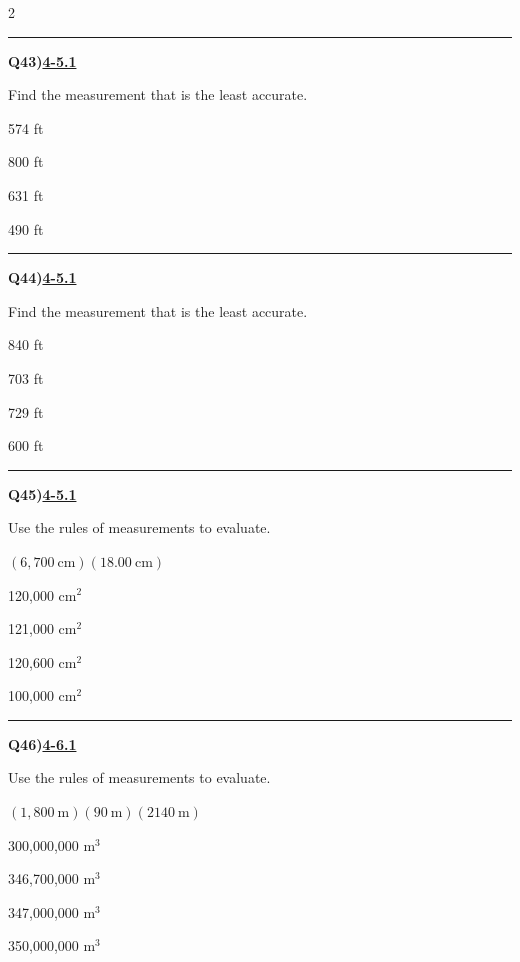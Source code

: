 \documentclass[11pt]{article}
\newenvironment{Qbox}[2]{%
  \par\medskip\noindent\begin{minipage}{\linewidth}%
  \hrule\medskip%
  \textbf{Q#1)}\hfill\textbf{\underline{#2}}\par\smallskip%
}{\par\end{minipage}\par\medskip}
\begin{document}
\begin{multicols}{2}
\begin{Qbox}{43}{4-5.1}
Find the measurement that is the least accurate.
\begin{choices}
  \item 574 ft
  \item 800 ft
  \item 631 ft
  \item 490 ft
\end{choices}
\end{Qbox}

\begin{Qbox}{44}{4-5.1}
Find the measurement that is the least accurate.
\begin{choices}
  \item 840 ft
  \item 703 ft
  \item 729 ft
  \item 600 ft
\end{choices}
\end{Qbox}

\begin{Qbox}{45}{4-5.1}
Use the rules of measurements to evaluate.\par\medskip $(6{,}700\ \text{cm})(18.00\ \text{cm})$
\begin{choices}
  \item 120,000 cm$^2$
  \item 121,000 cm$^2$
  \item 120,600 cm$^2$
  \item 100,000 cm$^2$
\end{choices}
\end{Qbox}

\begin{Qbox}{46}{4-6.1}
Use the rules of measurements to evaluate.\par\medskip $(1{,}800\ \text{m})(90\ \text{m})(2140\ \text{m})$
\begin{choices}
  \item 300,000,000 m$^3$
  \item 346,700,000 m$^3$
  \item 347,000,000 m$^3$
  \item 350,000,000 m$^3$
\end{choices}
\end{Qbox}


\end{multicols}
\end{document}
